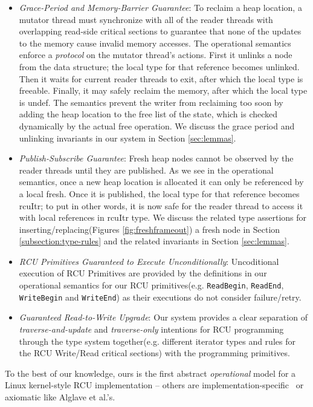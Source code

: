 \begin{itemize}
  \item \textit{Grace-Period and Memory-Barrier Guarantee}: To reclaim a heap location, a mutator thread must synchronize with all of the reader threads with overlapping read-side critical sections to guarantee that none of the updates to the memory cause invalid memory accesses.
The operational semantics enforce a \textit{protocol} on the mutator thread's actions. First it unlinks a node from the data structure; the local type for that reference becomes \textsf{unlinked}. Then it waits for current reader threads to exit, after which the local type is \textsf{freeable}. Finally, it may safely reclaim the memory, after which the local type is \textsf{undef}.
The semantics prevent the writer from reclaiming too soon by adding the heap location to the free list of the state, which is checked dynamically by the actual free operation. We discuss the grace period and unlinking invariants in our system in Section \ref{sec:lemmas}.
\item \textit{Publish-Subscribe Guarantee}: Fresh heap nodes cannot be observed by the reader threads until they are published. As we see in the operational semantics, once a new heap location is allocated it can only be referenced by a local \textsf{fresh}. Once it is published, the local type for that reference becomes \textsf{rcuItr}; to put in other words, it is now safe for the reader thread to access it with local references in \textsf{rcuItr} type. We discuss the related type assertions for inserting/replacing(Figures \ref{fig:freshframeout}) a fresh node in Section \ref{subsection:type-rules} and the related invariants in Section \ref{sec:lemmas}.
\item \textit{RCU Primitives Guaranteed to Execute Unconditionally}: Uncoditional execution of RCU Primitives are provided by the definitions in our operational semantics for our RCU primitives(e.g. \lstinline|ReadBegin|, \lstinline|ReadEnd|, \lstinline|WriteBegin| and \lstinline|WriteEnd|) as their executions do not consider failure/retry.
\item \textit{Guaranteed Read-to-Write Upgrade}: Our system provides a clear separation of \textit{traverse-and-update} and \textit{traverse-only} intentions for \textsf{RCU} programming through the type system together(e.g. different iterator types and rules for the RCU Write/Read critical sections) with the programming primitives. 
  \end{itemize}
To the best of our knowledge, ours is the first abstract \emph{operational} model for a Linux kernel-style RCU implementation -- others are implementation-specific~\cite{Mandrykin:2016:TDV:3001219.3001297} or axiomatic like Alglave et al.'s.


